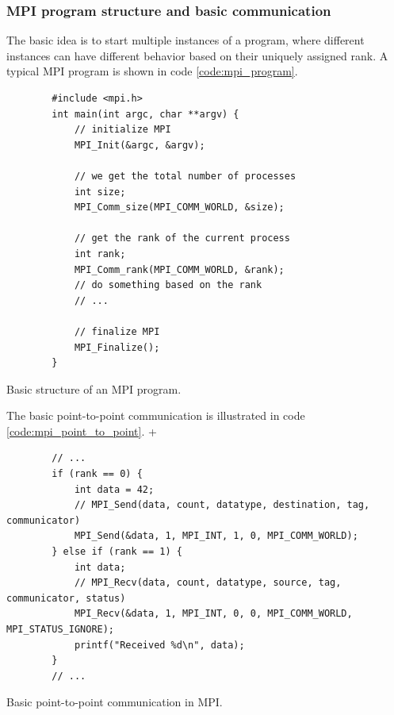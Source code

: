 \subsubsection{MPI program structure and basic communication}
The basic idea is to start multiple instances of a program, where different instances
can have different behavior based on their uniquely assigned rank. A typical MPI
program is shown in code \ref{code:mpi_program}.

\begin{codebox}[!htb]
    \begin{verbatim}
        #include <mpi.h>
        int main(int argc, char **argv) {
            // initialize MPI
            MPI_Init(&argc, &argv);

            // we get the total number of processes
            int size;
            MPI_Comm_size(MPI_COMM_WORLD, &size);

            // get the rank of the current process
            int rank;
            MPI_Comm_rank(MPI_COMM_WORLD, &rank);
            // do something based on the rank
            // ...

            // finalize MPI
            MPI_Finalize();
        }
    \end{verbatim}
    \caption{Basic structure of an MPI program.}
    \label{code:mpi_program}
\end{codebox}

The basic point-to-point communication is illustrated in code \ref{code:mpi_point_to_point}.
+

\begin{codebox}[!htb]
    \begin{verbatim}
        // ...
        if (rank == 0) {
            int data = 42;
            // MPI_Send(data, count, datatype, destination, tag, communicator)
            MPI_Send(&data, 1, MPI_INT, 1, 0, MPI_COMM_WORLD);
        } else if (rank == 1) {
            int data;
            // MPI_Recv(data, count, datatype, source, tag, communicator, status)
            MPI_Recv(&data, 1, MPI_INT, 0, 0, MPI_COMM_WORLD, MPI_STATUS_IGNORE);
            printf("Received %d\n", data);
        }
        // ...
    \end{verbatim}
    \caption{Basic point-to-point communication in MPI.}
    \label{code:mpi_point_to_point}
\end{codebox}

